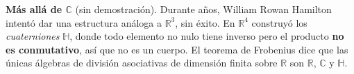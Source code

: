 \begin{nota}
\textbf{Más allá de $\mathbb{C}$} (sin demostración). Durante años, William Rowan
Hamilton intentó dar una estructura análoga a $\mathbb{R}^3$, sin éxito. En
$\mathbb{R}^4$ construyó los \emph{cuaterniones} $\mathbb{H}$, donde todo elemento
no nulo tiene inverso pero el producto \textbf{no es conmutativo}, así que no es un
cuerpo. El teorema de Frobenius dice que las únicas álgebras de división asociativas
de dimensión finita sobre $\mathbb{R}$ son $\mathbb{R}$, $\mathbb{C}$ y $\mathbb{H}$.
\end{nota}